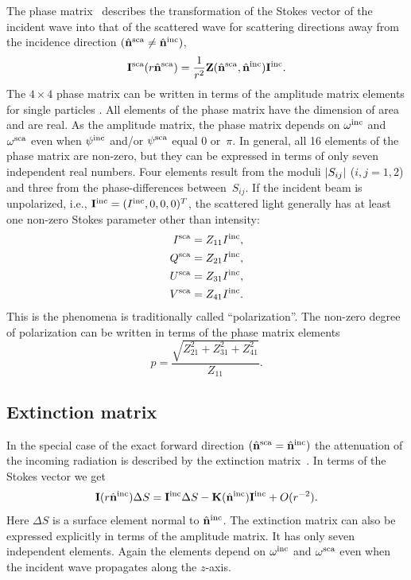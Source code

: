 The phase matrix \PhaMat\ describes the transformation of the Stokes
vector of the incident wave into that of the scattered wave for
scattering directions away from the incidence direction
$(\hat{{\bf n}}^{\mathrm{sca}}\neq\hat{{\bf n}}^{\mathrm{inc}})$,
\begin{equation}
  \label{eq:rtetheory:phase_matrix}
  {\bf I}^{\mathrm{sca}}(r \hat{{\bf n}}^{\mathrm{sca}}) =
    \frac{1}{r^2}{\bf Z}(\hat{{\bf n}}^{\mathrm{sca}},\hat{{\bf n}}^{\mathrm{inc}}) {\bf I}^{\mathrm{inc}}.
\end{equation}
The $4\times4$ phase matrix can be written in terms of the amplitude
matrix elements for single particles \citep{Mishchenko:02}. All
elements of the phase matrix have the dimension of area and are real.
As the amplitude matrix, the phase matrix depends on $\omega^{\mathrm{inc}}$
and $\omega^{\mathrm{sca}}$ even when $\psi^{\mathrm{inc}}$ and/or $\psi^{\mathrm{sca}}$ equal
0 or~$\pi$.  In general, all 16 elements of the phase matrix are
non-zero, but they can be expressed in terms of only seven independent
real numbers. Four elements result from the moduli $\left| S_{ij} \right| $ ($i,j =
1,2$) and three from the phase-differences between~$S_{ij}$.  If the
incident beam is unpolarized, i.e., ${\bf I}^{\mathrm{inc}} = (I^{\mathrm{inc}},
0, 0, 0)^T$, the scattered light generally has at least one
non-zero Stokes parameter other than intensity:
\begin{eqnarray}
  I^{\mathrm{sca}} &= Z_{11}I^{\mathrm{inc}},\\
  Q^{\mathrm{sca}} &= Z_{21}I^{\mathrm{inc}},\\
  U^{\mathrm{sca}} &= Z_{31}I^{\mathrm{inc}},\\
  V^{\mathrm{sca}} &= Z_{41}I^{\mathrm{inc}}.
\end{eqnarray}
This is the phenomena is traditionally called ``polarization''. The
non-zero degree of polarization 
can be written in terms of the phase matrix elements
\begin{equation}
  p = \frac{\sqrt{Z_{21}^2+Z_{31}^2+Z_{41}^2}}{Z_{11}}.
\end{equation}


\subsection{Extinction matrix}
\label{sec:rtetheory:ext_mat}
In the special case of the exact forward direction
$(\hat{{\bf n}}^{\mathrm{sca}}=\hat{{\bf n}}^{\mathrm{inc}})$ the attenuation of the
incoming radiation is described by the extinction matrix~\ExtMat. In
terms of the Stokes vector we get
\begin{equation}
  {\bf I}(r \hat{{\bf n}}^{\mathrm{inc}}) \Delta S =
    {\bf I}^{\mathrm{inc}} \Delta S - {\bf K}(\hat{{\bf n}}^{\mathrm{inc}}) {\bf I}^{\mathrm{inc}} + O(r^{-2}).
\end{equation}
Here $\Delta S$ is a surface element normal to
$\hat{{\bf n}}^{\mathrm{inc}}$.  The extinction matrix can also be expressed
explicitly in terms of the amplitude matrix. It has only seven
independent elements. Again the elements depend on $\omega^{\mathrm{inc}}$ and
$\omega^{\mathrm{sca}}$ even when the incident wave propagates along the
$z$-axis.

